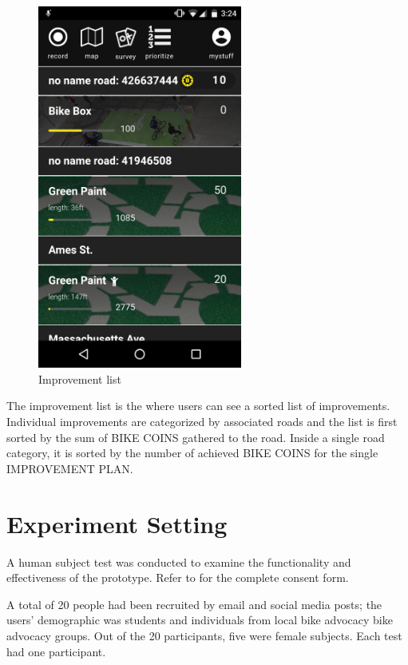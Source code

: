 \begin{figure}[!htb]
  \includegraphics[width=0.6\textwidth]{chapters/4/fig/interface_list.png}               
  \caption[interface: Improvement list]{Improvement list}
  \label{fig:interface_list}
\end{figure}

The improvement list is the where users can see a sorted list of improvements. Individual improvements are categorized by associated roads and the list is first sorted by the sum of BIKE COINS gathered to the road. Inside a single road category, it is sorted by the number of achieved BIKE COINS for the single IMPROVEMENT PLAN.


\section{Experiment Setting}
A human subject test was conducted to examine the functionality and effectiveness of the prototype. Refer to  for the complete consent form.

A total of 20 people had been recruited by email and social media posts; the users’ demographic was students and individuals from local
 bike advocacy bike advocacy groups. Out of the 20 participants, five were female subjects. Each test had one participant.

